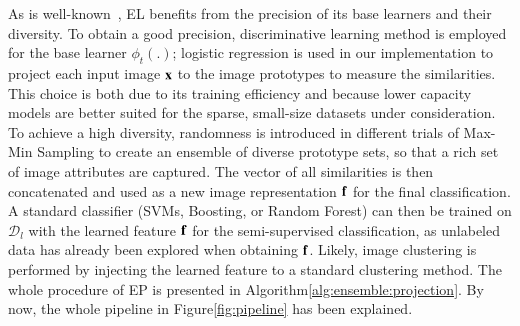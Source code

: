 \documentclass[preprint,12pt,3p]{elsarticle}
\begin{document}
As is well-known~\citep{zhou:ensemble}, EL benefits from the precision of its base learners
and their diversity.  
To obtain a good precision, discriminative learning method is employed for the
base learner $\phi_t(.)$; logistic regression is used in our
implementation to project each input image ${\mathbf x}$ to the image
prototypes to measure the similarities. This choice is both due to its
training efficiency and because lower capacity models are better suited
for the sparse, small-size datasets under consideration.  To achieve a high
diversity, randomness is introduced in different trials of Max-Min
Sampling to create an ensemble of diverse prototype sets, so that a
rich set of image attributes are captured.
The vector of all similarities is then concatenated and used as a new
image representation ${\mathbf f}$ for the final classification. A
standard classifier (\eg SVMs, Boosting, or Random Forest) can then be
trained on $\mathcal{D}_l$ with the learned feature ${\mathbf f}$ for the
semi-supervised classification, as unlabeled data has already been
explored when obtaining ${\mathbf f}$. Likely, image clustering is
performed by injecting the learned feature to a standard clustering
method.  The whole procedure of EP is presented in
Algorithm\ref{alg:ensemble:projection}.  By now, the whole pipeline in
Figure\ref{fig:pipeline} has been explained.
\end{document}
